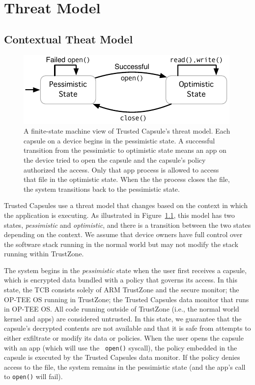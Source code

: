 \chapter{Threat Model}
\label{ch:ThreatModel}
\section{Contextual Theat Model}
\begin{figure}
  \centering
  \includegraphics[width=\columnwidth]{fig/state-machine.pdf}
  \caption{A finite-state machine view of Trusted Capsule's threat model. Each
    capsule on a device begins in the pessimistic state. A successful transition
    from the pessimistic to optimistic state means an app on the device tried to
    open the capsule and the capsule's policy authorized the access. Only that
    app process is allowed to access that file in the optimistic state. When the
    the process closes the file, the system transitions back to the pessimistic
    state.}
  \label{fig:threatmodelstatediag}
\end{figure}

Trusted Capsules use a threat model that changes based on the context in which the application is executing. As illustrated in
Figure~\ref{fig:threatmodelstatediag}, this model has two states, {\em
  pessimistic} and {\em optimistic}, and there is a transition between
the two states depending on the context. We assume that device owners
have full control over the software stack running in the normal world
but may not modify the stack running within TrustZone.

The system begins in the {\em pessimistic} state when the user first receives a
capsule, which is encrypted data bundled with a policy that
governs its access. In this state, the TCB consists solely of ARM TrustZone and
the secure monitor; the OP-TEE OS running in TrustZone; the Trusted Capsules
data monitor that runs in OP-TEE OS. All code running outside of TrustZone
(i.e., the normal world kernel and apps) are considered untrusted. In this
state, we guarantee that the capsule's decrypted contents are not available and
that it is safe from attempts to either exfiltrate or modify its data or
policies. When the user opens the capsule with an app (which will use the {\tt
  open()} syscall), the policy embedded in the capsule is executed by the
Trusted Capsules data monitor. If the policy denies access to the file, the
system remains in the pessimistic state (and the app's call to {\tt open()} will
fail).

